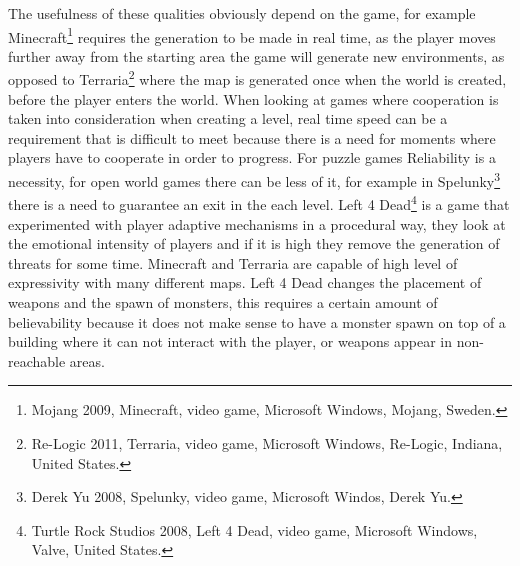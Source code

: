 \documentclass[runningheads]{llncs}
\begin{document}
The usefulness of these qualities obviously depend on the game, for example Minecraft\footnote{Mojang 2009, Minecraft, video game, Microsoft Windows, Mojang, Sweden.} requires the generation to be made in real time, as the player moves further away from the starting area the game will generate new environments, as opposed to Terraria\footnote{Re-Logic 2011, Terraria, video game, Microsoft Windows, Re-Logic, Indiana, United States.} where the map is generated once when the world is created, before the player enters the world. When looking at games where cooperation is taken into consideration when creating a level, real time speed can be a requirement that is difficult to meet because there is a need for moments where players have to cooperate in order to progress. For puzzle games Reliability is a necessity, for open world games there can be less of it, for example in Spelunky\footnote{Derek Yu 2008, Spelunky, video game, Microsoft Windos, Derek Yu.} there is a need to guarantee an exit in the each level. Left 4 Dead\footnote{Turtle Rock Studios 2008, Left 4 Dead, video game, Microsoft Windows, Valve, United States.} is a game that experimented with player adaptive mechanisms in a procedural way, they look at the emotional intensity of players and if it is high they remove the generation of threats for some time. Minecraft and Terraria are capable of high level of expressivity with many different maps. Left 4 Dead changes the placement of weapons and the spawn of monsters, this requires a certain amount of believability because it does not make sense to have a monster spawn on top of a building where it can not interact with the player, or weapons appear in non-reachable areas. 
\end{document}
